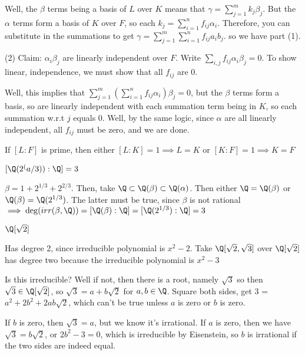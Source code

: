 \documentclass[10pt]{article}
\begin{document}
Well, the $\beta$ terms being a basis of $L$ over $K$ means that $\gamma = \sum\limits_{j = 1}^m k_j \beta_j$. But the $\alpha$ terms form a basis of $K$ over $F$, so each $k_j = \sum\limits_{i = 1}^n f_{ij}\alpha_i$. Therefore, you can substitute in the summations to get $\gamma = \sum\limits_{j=1}^m \sum\limits_{i = 1}^n f_{ij}a_ib_j$. so we have part (1).

(2) Claim: $\alpha_i\beta_j$ are linearly independent over $F$.
Write $\sum_{i, j}f_{ij}\alpha_i\beta_{j} = 0$. To show linear, independence, we must show that all $f_{ij}$ are 0.

Well, this implies that $\sum\limits_{j = 1}^m (\sum\limits_{i = 1}^n f_{ij} \alpha _i)\beta_j = 0$, but the $\beta$ terms form a basis, so are linearly independent with each summation term being in $K$, so each summation w.r.t $j$ equals 0. Well, by the same logic, since $\alpha$ are all linearly independent, all $f_{ij}$ must be zero, and we are done.

\begin{cor}
    If $[L : F]$ is prime, then either $[L : K] = 1 \implies L = K$ or $[K : F] = 1 \implies K = F$
\end{cor}

\begin{exm*}
    $[\Q(2^(a/3)) : \Q] = 3$
\end{exm*}
$\beta = 1 + 2^{1/3} + 2^{2/3}$. Then, take $\Q \subset \Q(\beta) \subset \Q(\alpha)$. Then either $\Q = \Q(\beta)$ or $\Q(\beta) = \Q(2^{1/3})$. The latter must be true, since $\beta$ is not rational $\implies \deg(irr(\beta, \Q)) = [\Q(\beta): \Q] = [\Q(2^{1/3}): \Q] = 3$

\begin{exm*}
    $\Q[\sqrt{2}]$
\end{exm*}
Has degree 2, since irreducible polynomial is $x^2 - 2$. Take $\Q[\sqrt{2}, \sqrt{3}]$ over $\Q[\sqrt{2}]$ has degree two because the irreducible polynomial is $x^2 - 3$ 

Is this irreducible? Well if not, then there is a root, namely $\sqrt3$ so then $\sqrt{3} \in \Q[\sqrt{2}]$, so $\sqrt3 = a + b\sqrt2$ for $a, b \in \Q$. Square both sides, get 3 = $a^2 + 2b^2 + 2ab\sqrt{2}$, which can't be true unless $a$ is zero or $b$ is zero.

If $b$ is zero, then $\sqrt{3} = a$, but we know it's irrational. If $a$ is zero, then we have $\sqrt{3} = b\sqrt{2}$, or $2b^2 - 3 = 0$, which is irreducible by Eisenstein, so $b$ is irrational if the two sides are indeed equal. 
\end{document}
